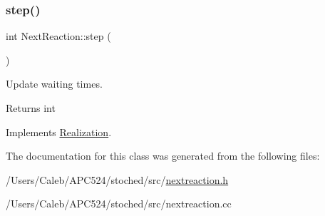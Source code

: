 \subsubsection{\texorpdfstring{step()}{step()}}
{\footnotesize\ttfamily int Next\+Reaction\+::step (\begin{DoxyParamCaption}{ }\end{DoxyParamCaption})\hspace{0.3cm}{\ttfamily [virtual]}}



Update waiting times. 

\begin{DoxyReturn}{Returns}
int 
\end{DoxyReturn}


Implements \hyperlink{class_realization_a9949217117927b149850288f3b74c9ef}{Realization}.



The documentation for this class was generated from the following files\+:\begin{DoxyCompactItemize}
\item 
/\+Users/\+Caleb/\+A\+P\+C524/stoched/src/\hyperlink{nextreaction_8h}{nextreaction.\+h}\item 
/\+Users/\+Caleb/\+A\+P\+C524/stoched/src/nextreaction.\+cc\end{DoxyCompactItemize}
